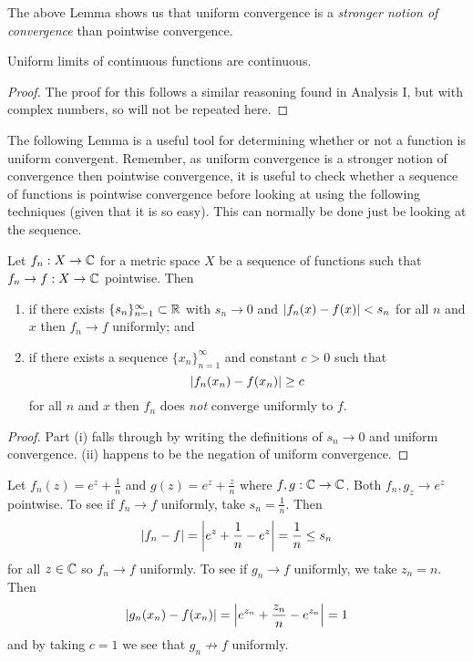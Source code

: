\begin{remark}
    The above Lemma shows us that uniform convergence is a \emph{stronger notion of convergence} than pointwise convergence.
\end{remark}

\begin{theorem}[]
    Uniform limits of continuous functions are continuous.
\end{theorem}

\begin{proof}
    The proof for this follows a similar reasoning found in Analysis I, but with complex numbers, so will not be repeated here.
\end{proof}

The following Lemma is a useful tool for determining whether or not a function is uniform convergent. 
Remember, as uniform convergence is a stronger notion of convergence then pointwise convergence, 
it is useful to check whether a sequence of functions is pointwise convergence before looking at using the following techniques (given that it is so easy). 
This can normally be done just be looking at the sequence. 

\begin{lemma}
    Let $f_n : X \to \mathbb{C}$ for a metric space $X$ be a sequence of functions such that $f_n \to f: X \to \mathbb{C}$ pointwise.
    Then
    \begin{enumerate}
        \item if there exists $\{s_n\}_{n = 1}^\infty \subset \mathbb{R}$ with $s_n \to 0$ and $\left\lvert f_n(x) - f(x)\right\rvert < s_n$ for all $n$ and $x$ then $f_n \to f$ uniformly; and
        \item if there exists a sequence $\{x_n\}_{n = 1}^\infty$ and constant $c > 0$ such that
            \[ \left\lvert f_n(x_n) - f(x_n)\right\rvert \geq c \]
            for all $n$ and $x$ then $f_n$ does \emph{not} converge uniformly to $f$.
    \end{enumerate}
\end{lemma}

\begin{proof}
    Part (i) falls through by writing the definitions of $s_n \to 0$ and uniform convergence. 
    (ii) happens to be the negation of uniform convergence.
\end{proof}

\begin{example}
    Let $f_n(z) = e^z + \frac 1n$ and $g(z) = e^z + \frac zn$ where $f, g: \mathbb{C} \to \mathbb{C}$. Both $f_n, g_z \to e^z$ pointwise. To see if $f_n \to f$ uniformly, take $s_n = \frac 1n$. Then
    \[ \left\lvert f_n - f\right\rvert = \left\lvert e^z + \frac 1n - e^z\right\rvert = \frac 1n \leq s_n \]
    for all $z \in \mathbb{C}$ so $f_n \to f$ uniformly.
    To see if $g_n \to f$ uniformly, we take $z_n = n$. Then 
    \[ \left\lvert g_n(x_n) - f(x_n)\right\rvert = \left\lvert e^{z_n} + \frac{z_n}n - e^{z_n}\right\rvert = 1 \] and by taking $c = 1$ we see that $g_n \not \to f$ uniformly.
\end{example}
